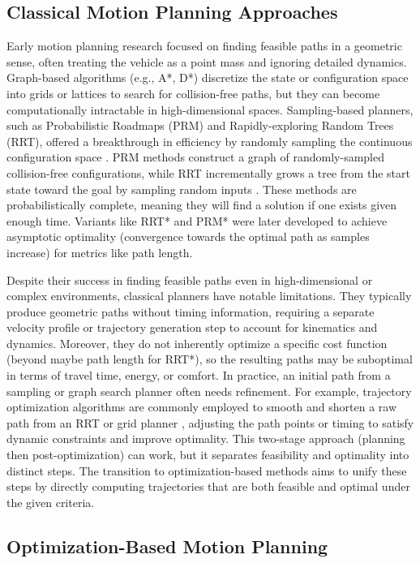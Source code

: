 
\subsection{Classical Motion Planning Approaches}

Early motion planning research focused on finding feasible paths in a geometric sense, often treating the vehicle as a point mass and ignoring
detailed dynamics.
Graph-based algorithms (e.g., A*, D*) discretize the state or configuration space into grids or lattices to search for collision-free paths, but they
can become computationally intractable in high-dimensional spaces.
Sampling-based planners, such as Probabilistic Roadmaps (PRM) and Rapidly-exploring Random Trees (RRT), offered a breakthrough in efficiency by
randomly sampling the continuous configuration space \cite{orthey_sampling-based_2024}.
PRM methods construct a graph of randomly-sampled collision-free configurations, while RRT incrementally grows a tree from the start state toward the
goal by sampling random inputs \cite{orthey_sampling-based_2024}.
These methods are probabilistically complete, meaning they will find a solution if one exists given enough time.
Variants like RRT* and PRM* were later developed to achieve asymptotic optimality (convergence towards the optimal path as samples increase) for
metrics like path length.

Despite their success in finding feasible paths even in high-dimensional or complex environments, classical planners have notable limitations.
They typically produce geometric paths without timing information, requiring a separate velocity profile or trajectory generation step to account for
kinematics and dynamics.
Moreover, they do not inherently optimize a specific cost function (beyond maybe path length for RRT*), so the resulting paths may be suboptimal in
terms of travel time, energy, or comfort.
In practice, an initial path from a sampling or graph search planner often needs refinement.
For example, trajectory optimization algorithms are commonly employed to smooth and shorten a raw path from an RRT or grid planner
\cite{schulman_finding_2013}, adjusting the path points or timing to satisfy dynamic constraints and improve optimality.
This two-stage approach (planning then post-optimization) can work, but it separates feasibility and optimality into distinct steps.
The transition to optimization-based methods aims to unify these steps by directly computing trajectories that are both feasible and optimal under
the given criteria.

\subsection{Optimization-Based Motion Planning}

